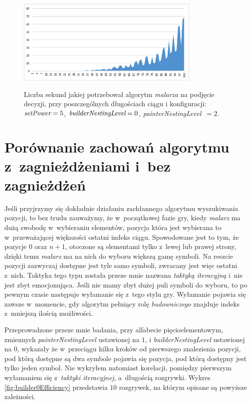 \documentclass[document]{xmgr}
\begin{document}
\begin{figure}[tbh]
    \centering
    \caption{Liczba sekund jakiej potrzebował algorytm \emph{malarza} na podjęcie decyzji, przy poszczególnych długościach ciągu i konfiguracji: $\emph{setPower}=5$, $\emph{builderNestingLevel}=0$, \emph{painterNestingLevel}~$=2$.}
    \includegraphics[width = 0.8\textwidth]{images/timePainter2Builder0}
    \label{fig:painter2builder0}
\end{figure}




\section{Porównanie zachowań algorytmu z~zagnieżdżeniami i~bez zagnieżdżeń}
Jeśli przyjrzymy się dokładnie działaniu zachłannego algorytmu wyszukiwania pozycji, to bez trudu zauważymy, że w~początkowej fazie gry, kiedy \emph{malarz} ma dużą swobodę w~wybieraniu elementów, pozycja która jest wybierana to w~przeważającej większości ostatni indeks ciągu. Spowodowane jest to tym, że pozycje $0$ oraz $n+1$, otoczone są elementami tylko z~lewej lub prawej strony, dzięki temu \emph{malarz} ma na nich do wyboru większą gamę symboli. Na reszcie pozycji zazwyczaj dostępne jest tyle samo symboli, zwracany jest więc ostatni z~nich. Taktyka tego typu została przeze mnie nazwana \emph{taktyką iteracyjną} i~nie jest zbyt emocjonująca. Jeśli nie mamy zbyt dużej puli symboli do wyboru, to po pewnym czasie następuje wyłamanie się z~tego stylu gry. Wyłamanie pojawia się zawsze w~momencie, gdy algorytm pełniący rolę \emph{budowniczego} znajduje indeks z~mniejszą ilością możliwości. 

Przeprowadzone przeze mnie badania, przy alfabecie pięcioelementowym, zmiennych \emph{painterNestingLevel} ustawionej na $1$, i \emph{builderNestingLevel} ustawionej na $0$, wykazały że w~przeciągu kilku kroków od pierwszego znalezienia pozycji, pod którą dostępne są dwa symbole pojawia się pozycja, pod którą dostępny jest tylko jeden symbol. Nie wykryłem natomiast korelacji, pomiędzy pierwszym wyłamaniem się z~\emph{taktyki iteracyjnej}, a~długością rozgrywki. Wykres \ref{fig:builder0Efficiency} przedstawia $10$ rozgrywek, na którym opisane są powyższe zależności.
 
\end{document}
